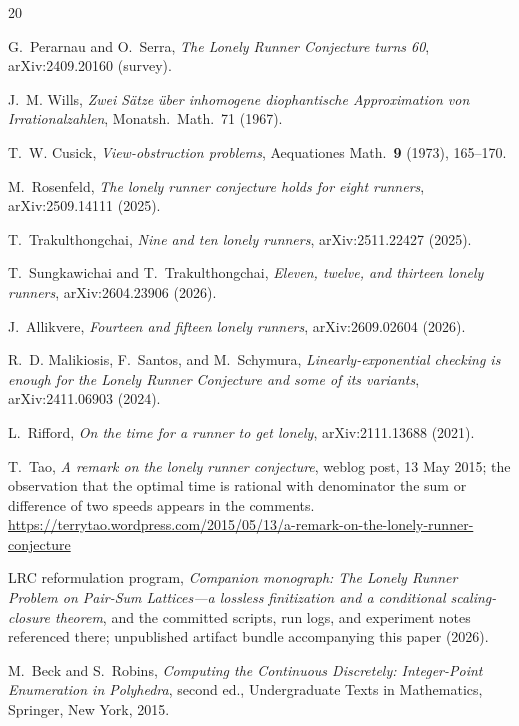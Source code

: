 \documentclass[11pt,a4paper]{article}
\numberwithin{equation}{section}
\theoremstyle{plain}
\theoremstyle{definition}
\theoremstyle{remark}
\begin{document}
\begingroup\sloppy\raggedright
\begin{thebibliography}{20}

G.~Perarnau and O.~Serra,
\emph{The Lonely Runner Conjecture turns 60},
arXiv:2409.20160 (survey).

J.~M. Wills,
\emph{Zwei S\"atze \"uber inhomogene diophantische Approximation von
Irrationalzahlen},
Monatsh.\ Math.\ 71 (1967).

T.~W. Cusick,
\emph{View-obstruction problems},
Aequationes Math.\ \textbf{9} (1973), 165--170.

M.~Rosenfeld,
\emph{The lonely runner conjecture holds for eight runners},
arXiv:2509.14111 (2025).

T.~Trakulthongchai,
\emph{Nine and ten lonely runners},
arXiv:2511.22427 (2025).

T.~Sungkawichai and T.~Trakulthongchai,
\emph{Eleven, twelve, and thirteen lonely runners},
arXiv:2604.23906 (2026).

J.~Allikvere,
\emph{Fourteen and fifteen lonely runners},
arXiv:2609.02604 (2026).

R.~D. Malikiosis, F.~Santos, and M.~Schymura,
\emph{Linearly-exponential checking is enough for the Lonely Runner
Conjecture and some of its variants},
arXiv:2411.06903 (2024).

L.~Rifford,
\emph{On the time for a runner to get lonely},
arXiv:2111.13688 (2021).

T.~Tao,
\emph{A remark on the lonely runner conjecture},
weblog post, 13 May 2015; the observation that the optimal time is
rational with denominator the sum or difference of two speeds appears
in the comments.
\\[2pt]
\url{https://terrytao.wordpress.com/2015/05/13/a-remark-on-the-lonely-runner-conjecture}

LRC reformulation program,
\emph{Companion monograph: The Lonely Runner Problem on Pair-Sum
Lattices---a lossless finitization and a conditional scaling-closure
theorem}, and the committed scripts, run logs, and experiment notes
referenced there; unpublished artifact bundle accompanying this paper
(2026).

M.~Beck and S.~Robins,
\emph{Computing the Continuous Discretely: Integer-Point Enumeration
in Polyhedra}, second ed.,
Undergraduate Texts in Mathematics, Springer, New York, 2015.


\end{thebibliography}
\end{document}
